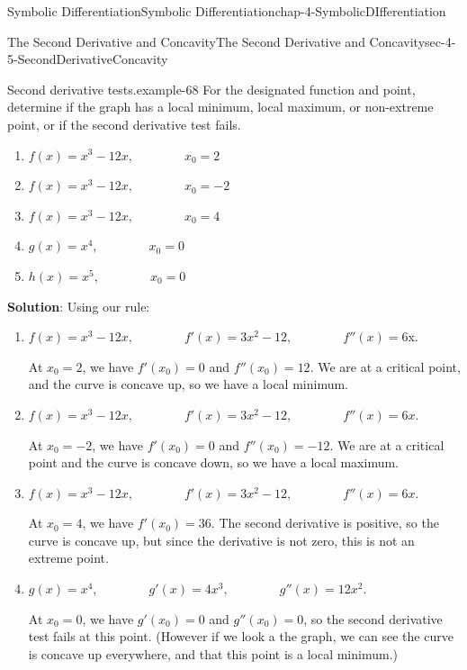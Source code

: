 \documentclass[oneside,10pt,]{book}
\newcommand{\terminology}[1]{\textbf{#1}}
\numberwithin{equation}{section}
\begin{document}
\begin{chapterptx}{Symbolic Differentiation}{}{Symbolic Differentiation}{}{}{chap-4-SymbolicDIfferentiation}
\begin{sectionptx}{The Second Derivative and Concavity}{}{The Second Derivative and Concavity}{}{}{sec-4-5-SecondDerivativeConcavity}
\begin{example}{Second derivative tests.}{example-68}%
\hypertarget{p-1801}{}%
For the designated function and point, determine if the graph has a local minimum, local maximum, or non-extreme point, or if the second derivative test fails.%
\leavevmode%
\begin{enumerate}[label=(\alph*)]
\item\hypertarget{li-530}{}\(f(x)=x^3-12 x,\qquad\qquad x_0=2\)%
\item\hypertarget{li-531}{}\(f(x)=x^3-12 x,\qquad\qquad x_0=-2\)%
\item\hypertarget{li-532}{}\(f(x)=x^3-12 x,\qquad\qquad x_0=4\)%
\item\hypertarget{li-533}{}\(g(x)=x^4,\qquad\qquad x_0=0\)%
\item\hypertarget{li-534}{}\(h(x)=x^5,\qquad\qquad x_0=0\)%
\end{enumerate}
\hypertarget{p-1802}{}%
\terminology{Solution}: Using our rule:%
\leavevmode%
\begin{enumerate}[label=(\alph*)]
\item\hypertarget{li-535}{}\hypertarget{p-1803}{}%
\(f(x)=x^3-12 x,\qquad\qquad f'(x)=3x^2-12,\qquad\qquad f''(x)=6\)x.%
\par
\hypertarget{p-1804}{}%
At \(x_0=2\), we have \(f'(x_0)=0\) and \(f''(x_0)=12\).  We are at a critical point, and the curve is concave up, so we have a local minimum.%
\item\hypertarget{li-536}{}\hypertarget{p-1805}{}%
\(f(x)=x^3-12 x,\qquad\qquad f'(x)=3x^2-12,\qquad\qquad f''(x)=6x\).%
\par
\hypertarget{p-1806}{}%
At \(x_0=-2\), we have \(f'(x_0)=0\) and \(f'' (x_0 )=-12\).  We are at a critical point and the curve is concave down, so we have a local maximum.%
\item\hypertarget{li-537}{}\hypertarget{p-1807}{}%
\(f(x)=x^3-12 x,\qquad\qquad f'(x)=3x^2-12,\qquad\qquad f''(x)=6x\).%
\par
\hypertarget{p-1808}{}%
At \(x_0=4\), we have \(f'(x_0)=36\).  The second derivative is positive, so the curve is concave up, but since the derivative is not zero, this is not an extreme point.%
\item\hypertarget{li-538}{}\hypertarget{p-1809}{}%
\(g(x)=x^4,\qquad\qquad g'(x)=4x^3,\qquad\qquad g''(x)=12x^2\).%
\par
\hypertarget{p-1810}{}%
At \(x_0=0\), we have \(g'(x_0)=0\) and \(g''(x_0)=0\), so the second derivative test fails at this point.  (However if we look a the graph, we can see the curve is concave up everywhere, and that this point is a local minimum.)%

\end{enumerate}
\end{example}
\end{sectionptx}
\end{chapterptx}
\end{document}
